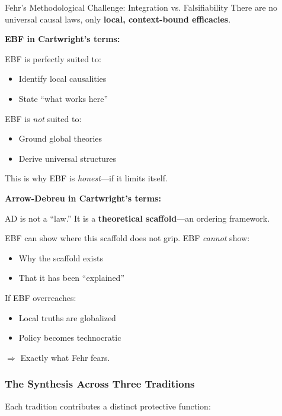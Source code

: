 \begin{chapter}{Fehr's Methodological Challenge: Integration vs. Falsifiability}
There are no universal causal laws, only \textbf{local, context-bound efficacies}.

\textbf{EBF in Cartwright's terms:}

EBF is perfectly suited to:
\begin{itemize}[noitemsep]
    \item Identify local causalities
    \item State ``what works here''
\end{itemize}

EBF is \textit{not} suited to:
\begin{itemize}[noitemsep]
    \item Ground global theories
    \item Derive universal structures
\end{itemize}

This is why EBF is \textit{honest}---if it limits itself.

\textbf{Arrow-Debreu in Cartwright's terms:}

AD is not a ``law.'' It is a \textbf{theoretical scaffold}---an ordering framework.

EBF can show where this scaffold does not grip. EBF \textit{cannot} show:
\begin{itemize}[noitemsep]
    \item Why the scaffold exists
    \item That it has been ``explained''
\end{itemize}

\begin{tcolorbox}[colback=yellow!5!white,colframe=yellow!75!black,title=\textbf{Cartwright's Implicit Warning}]
If EBF overreaches:
\begin{itemize}[noitemsep]
    \item Local truths are globalized
    \item Policy becomes technocratic
\end{itemize}
$\Rightarrow$ Exactly what Fehr fears.
\end{tcolorbox}

\subsubsection{The Synthesis Across Three Traditions}

Each tradition contributes a distinct protective function:


\end{chapter}

